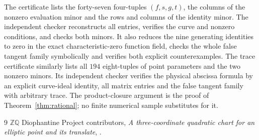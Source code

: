 \documentclass[11pt,a4paper]{article}
\begin{document}
The certificate lists the forty-seven four-tuples $(f,s,g,t)$,
the columns of the nonzero evaluation minor and the rows and columns
of the identity minor. The independent checker reconstructs all
entries, verifies the curve and nonzero conditions, and checks both
minors. It also reduces the nine generating identities to zero in
the exact characteristic-zero function field, checks the whole
false tangent family symbolically and verifies both explicit
counterexamples. The trace certificate similarly lists all $194$ eight-tuples of point
parameters and the two nonzero minors. Its independent checker verifies
the physical abscissa formula by an explicit curve-ideal identity, all
matrix entries and the false tangent family with arbitrary trace.
The product-closure argument is the proof of
Theorem~\ref{thm:rational}; no finite numerical sample substitutes for it.

\begin{thebibliography}{9}
$\mathbb Z\mathbb Q$ Diophantine Project contributors,
\emph{A three-coordinate quadratic chart for an elliptic point and its translate},
.
\end{thebibliography}
\end{document}
